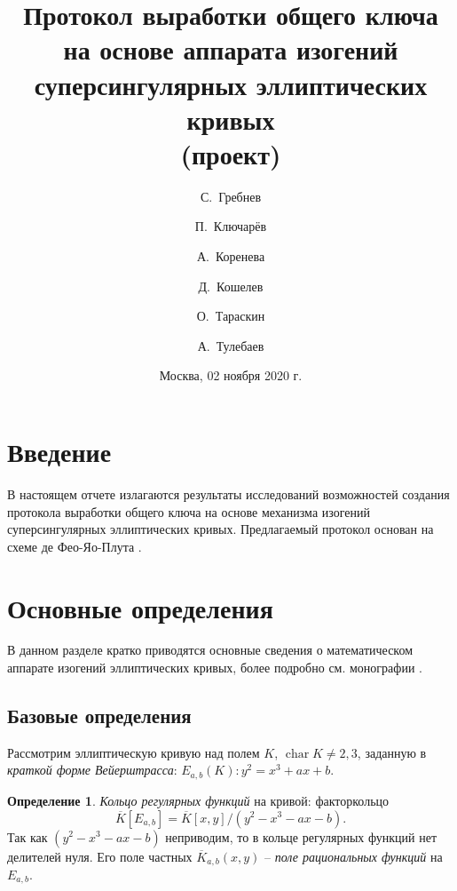 \documentclass[a4paper,12pt]{article}
\title{ Протокол выработки общего ключа на основе аппарата изогений суперсингулярных эллиптических кривых \\(проект)}
\author[1]{С.~Гребнев}
\author[2]{П.~Ключарёв}
\author[3]{А.~Коренева}
\author[4]{Д.~Кошелев}
\author[5]{О.~Тараскин}
\author[3]{А.~Тулебаев}
\affil[1]{QAPP}
\affil[2]{МГТУ им.~Н.Э.~Баумана}
\affil[3]{Код безопасности}
\affil[4]{ИнфоТеКС}
\affil[5]{Waves}
\date{Москва, 02 ноября 2020 г.}
\DeclareMathOperator{\Char}{char}
\theoremstyle{definition}
\newtheorem{definition}{Определение}
\renewcommand{\baselinestretch}{1.35}
\begin{document}
 

\maketitle
\newpage
\tableofcontents
\newpage

\renewcommand{\baselinestretch}{1.35}\large
\section*{Введение}

В настоящем  отчете излагаются  результаты исследований возможностей создания протокола выработки общего ключа   на основе механизма изогений суперсингулярных эллиптических кривых. Предлагаемый протокол основан на схеме де Фео-Яо-Плута \cite{DF}.


\section{Основные определения}

В данном разделе кратко приводятся основные сведения о математическом аппарате изогений эллиптических кривых, более подробно см.  монографии \cite{Silverman, Wash}.

\subsection{Базовые определения}

Рассмотрим эллиптическую кривую над  полем $K$, $\Char K\neq2,3$, заданную в \emph{краткой форме Вейерштрасса}: $E_{a,b}(K): y^2=x^3+ax+b$.

\begin{definition}
\emph{Кольцо регулярных функций} на кривой: факторкольцо $$\overline{K}[E_{a,b}]=\overline{K}[x,y]/(y^2-x^3-ax-b).$$
Так как $(y^2-x^3-ax-b)$ неприводим, то в кольце регулярных функций нет делителей нуля.
Его поле частных $\overline{K}_{a,b}(x,y)$ -- \emph{поле рациональных функций} на $E_{a,b}$.
\end{definition}

\end{document}
